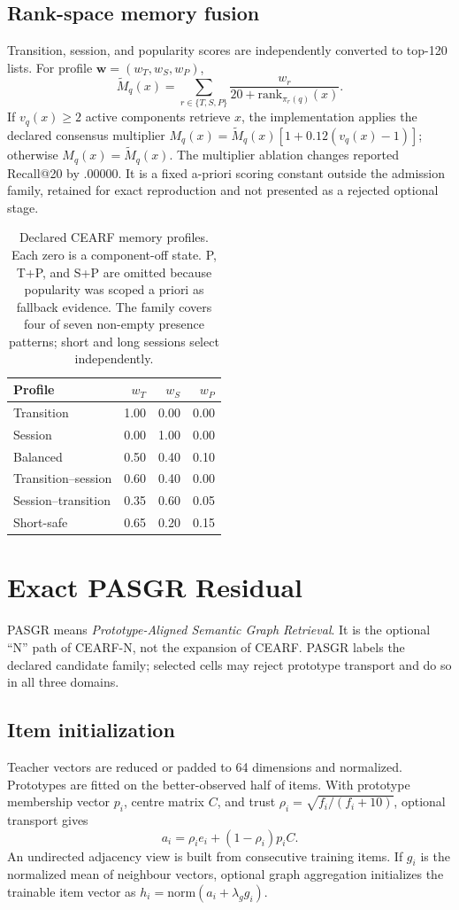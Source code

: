 \documentclass[runningheads]{llncs}
\newcommand{\method}{CEARF-N}
\begin{document}
\subsection{Rank-space memory fusion}
Transition, session, and popularity scores are independently converted to
top-120 lists. For profile $\mathbf w=(w_T,w_S,w_P)$,
\[
\widetilde M_q(x)=
\sum_{r\in\{T,S,P\}}
\frac{w_r}{20+\mathrm{rank}_{\pi_r(q)}(x)}.
\]
If $v_q(x)\geq2$ active components retrieve $x$, the implementation applies
the declared consensus multiplier
$M_q(x)=\widetilde M_q(x)[1+0.12(v_q(x)-1)]$; otherwise
$M_q(x)=\widetilde M_q(x)$. The multiplier ablation changes reported
Recall@20 by .00000. It is a fixed a-priori scoring constant outside the
admission family, retained for exact reproduction and not presented as a
rejected optional stage.

\begin{table}[t]
\caption{Declared CEARF memory profiles. Each zero is a component-off state.
P, T+P, and S+P are omitted because popularity was scoped a priori as
fallback evidence. The family covers four of seven non-empty presence patterns;
short and long sessions select independently.}
\centering
\begin{tabular}{lrrr}
\toprule
Profile & $w_T$ & $w_S$ & $w_P$\\
\midrule
Transition & 1.00 & 0.00 & 0.00\\
Session & 0.00 & 1.00 & 0.00\\
Balanced & 0.50 & 0.40 & 0.10\\
Transition--session & 0.60 & 0.40 & 0.00\\
Session--transition & 0.35 & 0.60 & 0.05\\
Short-safe & 0.65 & 0.20 & 0.15\\
\bottomrule
\end{tabular}
\end{table}

\section{Exact PASGR Residual}
PASGR means \emph{Prototype-Aligned Semantic Graph Retrieval}. It is the
optional ``N'' path of \method{}, not the expansion of CEARF. PASGR labels the
declared candidate family; selected cells may reject prototype transport and
do so in all three domains.

\subsection{Item initialization}
Teacher vectors are reduced or padded to 64 dimensions and normalized.
Prototypes are fitted on the better-observed half of items. With prototype
membership vector $p_i$, centre matrix $C$, and trust
$\rho_i=\sqrt{f_i/(f_i+10)}$, optional transport gives
\[
a_i=\rho_i e_i+(1-\rho_i)p_iC.
\]
An undirected adjacency view is built from consecutive training items. If
$g_i$ is the normalized mean of neighbour vectors, optional graph aggregation
initializes the trainable item vector as
$h_i=\mathrm{norm}(a_i+\lambda_g g_i)$.
\end{document}
